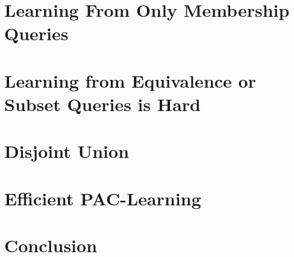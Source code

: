 \documentclass[runningheads]{llncs}
\begin{document}
\section{Learning From Only Membership Queries}


\section{Learning from Equivalence or Subset Queries is Hard}


\section{Disjoint Union}


\section{Efficient PAC-Learning}


\section{Conclusion}




\end{document}

